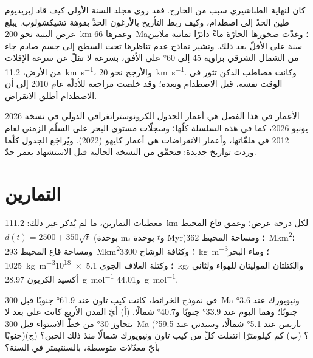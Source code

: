 كان لنهاية الطباشيري سبب من الخارج. فقد روى مجلد السنة الأولى كيف قاد إيريديوم
طين الحدّ إلى اصطدام، وكيف ربط التأريخ بالأرغون الحدَّ بفوهة تشيكشولوب.
يبلغ عرض البنية نحو \qty{200}{km} وعمرها \qty{66}{Ma}؛ وغذّت
صخورها الحارّة ماءً دائرًا ثمانية ملايين سنة على الأقلّ بعد ذلك. وتشير نماذج عدم تناظرها
تحت السطح إلى جسم صادم جاء من الشمال الشرقي بزاوية 45 إلى \ang{60} على الأفق،
بسرعة لا تقلّ عن سرعة الإفلات من الأرض، \qty{11.2}{km.s^{-1}}، والأرجح نحو
\qty{20}{km.s^{-1}}. وكانت مصاطب الدكن تثور في الوقت نفسه، قبل الاصطدام
وبعده؛ وقد خلصت مراجعة للأدلّة عام 2010 إلى أن الاصطدام أطلق الانقراض.

\begin{dated}{2026}
الأعمار في هذا الفصل هي أعمار الجدول الكرونوستراتغرافي الدولي في نسخة يونيو
2026، كما في هذه السلسلة كلّها؛ وسجلّات مستوى البحر على السلّم الزمني لعام 2012
في ملفّاتها، وأعمار الانقراضات هي أعمار كايهو (2022). ويُراجَع الجدول كلّما وردت
تواريخ جديدة: فتحقّق من النسخة الحالية قبل الاستشهاد بعمر حدّ.
\end{dated}

\section*{التمارين}\label{sec:b2:phanerozoic-earth:exercises}

معطيات التمارين، ما لم يُذكر غير ذلك: \qty{111.2}{km} لكل درجة عرض؛ وعمق
قاع المحيط $d(t) = 2500 + 350\sqrt t$ (بوحدة \unit{m}، و$t$ بوحدة \unit{Myr})؛ ومساحة المحيط
\qty{362}{\mega km^2}؛ ومساحة قاع المحيط \qty{293}{\mega km^2}؛ وكثافة الوشاح
\qty{3300}{kg.m^{-3}}؛ وماء البحر \qty{1025}{kg.m^{-3}}؛ وكتلة الغلاف الجوي
\qty{5.1e18}{kg}، والكتلتان الموليتان للهواء ولثاني أكسيد الكربون \qty{28.97}{g.mol^{-1}}
و\qty{44.01}{g.mol^{-1}}.

\begin{exercise}[$\star$]\label{exo:b2:phanerozoic-earth:1}
في نموذج الخرائط، كانت كيب تاون عند \ang{61.9} جنوبًا قبل \qty{300}{Ma} ونيويورك عند
\ang{3.6} جنوبًا؛ وهما اليوم عند \ang{33.9} جنوبًا و\ang{40.7} شمالًا. (أ) أيّ المدن الأربع كانت
على بعد لا يتجاوز \ang{30} من خطّ الاستواء قبل \qty{300}{Ma} (باريس عند \ang{5.1} شمالًا، وسيدني عند
\ang{59.5} جنوبًا)؟ (ب) كم كيلومترًا انتقلت كلّ من كيب تاون ونيويورك شمالًا منذ ذلك الحين؟
(ج) بأيّ معدّلات متوسطة، بالسنتيمتر في السنة؟
\end{exercise}

